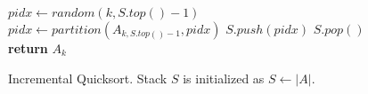\begin{figure}[!t]
\begin{algorithmic}[1]
	\State $pidx \gets random(k,S.top()-1)$
	\State $pidx \gets partition(A_{k,S.top()-1}, pidx)$
	\State $S.push(pidx)$
\EndWhile \label{IQS main cycle}
\State $S.pop()$
\State \textbf{return} $A_{k}$
\EndProcedure
\end{algorithmic}
\caption{Incremental Quicksort. Stack $S$ is initialized as $S \gets |A|$.}\label{iqs}
\end{figure}